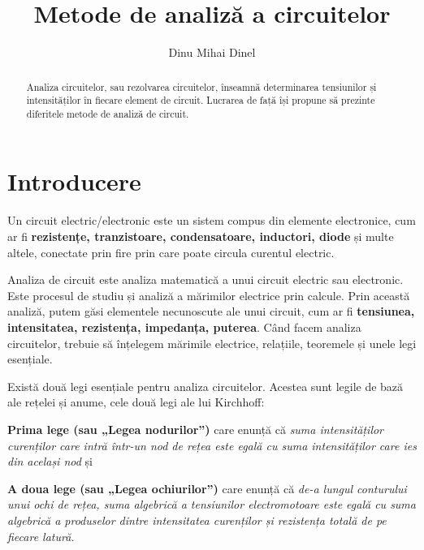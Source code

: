 \documentclass{article}
\title{Metode de analiză a circuitelor}
\author{Dinu Mihai Dinel}
\date{}
\begin{document}
\maketitle

\begin{abstract}
Analiza circuitelor, sau rezolvarea circuitelor, înseamnă determinarea tensiunilor și intensităților în fiecare element de circuit. Lucrarea de față își propune să prezinte diferitele metode de analiză de circuit. 
\end{abstract}

\section{Introducere}

\par Un circuit electric/electronic este un sistem compus din elemente electronice, cum ar fi \textbf{rezistențe, tranzistoare, condensatoare, inductori, diode} și multe altele, conectate prin fire prin care poate circula curentul electric.
\par Analiza de circuit este analiza matematică a unui circuit electric sau electronic. Este procesul de studiu și analiză a mărimilor electrice prin calcule. Prin această analiză, putem găsi elementele necunoscute ale unui circuit, cum ar fi \textbf{tensiunea, intensitatea, rezistența, impedanța, puterea}. Când facem analiza circuitelor, trebuie să înțelegem mărimile electrice, relațiile, teoremele și unele legi esențiale.
\par Există două legi esențiale pentru analiza circuitelor. Acestea sunt legile de bază ale rețelei și anume, cele două legi ale lui Kirchhoff:
\par \textbf{Prima lege (sau „Legea nodurilor”)} care enunță că \textit{suma intensităților curenților care intră într-un nod de rețea este egală cu suma intensităților care ies din același nod} și
\par \textbf{A doua lege (sau „Legea ochiurilor”)} care enunță că \textit{de-a lungul conturului unui ochi de rețea, suma algebrică a tensiunilor electromotoare este egală cu suma algebrică a produselor dintre intensitatea curenților și rezistența totală de pe fiecare latură.}
\end{document}
